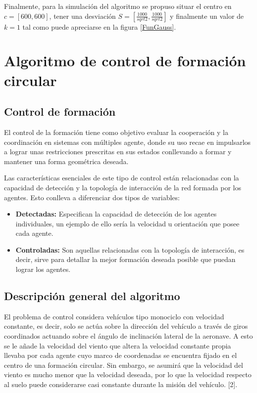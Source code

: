 Finalmente, para la simulación del algoritmo se propuso situar el centro en $c=\left[600,600\right]$, tener una desviación $S=\left[\frac{1000}{sqrt{2}},\frac{1000}{sqrt{2}}\right]$ y finalmente un valor de $k=1$ tal como puede apreciarse en la figura \ref{FunGauss}.

\section{Algoritmo de control de formación circular}

\subsection{Control de formación}

El control de la formación tiene como objetivo evaluar la cooperación y la coordinación en sistemas con múltiples agente, donde su uso recae en impulsarlos a lograr unas restricciones prescritas en sus estados conllevando a formar y mantener una forma geométrica deseada.

Las características esenciales de este tipo de control están relacionadas con la capacidad de detección y la topología de interacción de la red formada por los agentes. Esto conlleva a diferenciar dos tipos de variables:

\begin{itemize}
	\item \textbf{Detectadas:} Especifican la capacidad de detección de los agentes individuales, un ejemplo de ello sería la velocidad u orientación que posee cada agente.
	\item \textbf{Controladas:} Son aquellas relacionadas con la topología de interacción, es decir, sirve para detallar la mejor formación deseada posible que puedan lograr los agentes.
\end{itemize}

\subsection{Descripción general del algoritmo}

El problema de control considera vehículos tipo monociclo con velocidad constante, es decir, solo se actúa sobre la dirección del vehículo a través de giros coordinados actuando sobre el ángulo de inclinación lateral de la aeronave. A esto se le añade la velocidad del viento que altera la velocidad constante propia llevaba por cada agente cuyo marco de coordenadas se encuentra fijado en el centro de una formación circular. Sin embargo, se asumirá que la velocidad del viento es mucho menor que la velocidad deseada, por lo que la velocidad respecto al suelo puede considerarse casi constante durante la misión del vehículo. [2].

